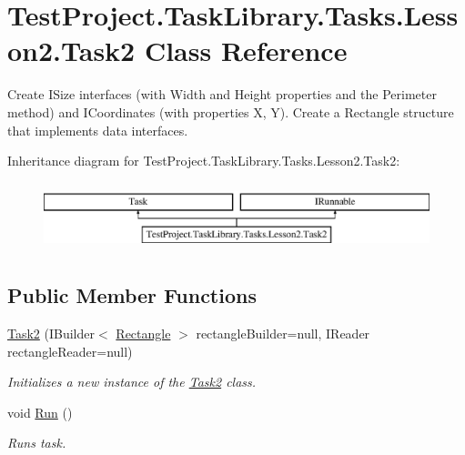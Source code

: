 \hypertarget{class_test_project_1_1_task_library_1_1_tasks_1_1_lesson2_1_1_task2}{}\section{Test\+Project.\+Task\+Library.\+Tasks.\+Lesson2.\+Task2 Class Reference}
\label{class_test_project_1_1_task_library_1_1_tasks_1_1_lesson2_1_1_task2}


Create I\+Size interfaces (with Width and Height properties and the Perimeter method) and I\+Coordinates (with properties X, Y). Create a Rectangle structure that implements data interfaces.  


Inheritance diagram for Test\+Project.\+Task\+Library.\+Tasks.\+Lesson2.\+Task2\+:\begin{figure}[H]
\begin{center}
\leavevmode
\includegraphics[height=2.000000cm]{class_test_project_1_1_task_library_1_1_tasks_1_1_lesson2_1_1_task2}
\end{center}
\end{figure}
\subsection*{Public Member Functions}
\begin{DoxyCompactItemize}
\item 
\mbox{\hyperlink{class_test_project_1_1_task_library_1_1_tasks_1_1_lesson2_1_1_task2_a0dc2439be966c494ca1b8097df9a803c}{Task2}} (I\+Builder$<$ \mbox{\hyperlink{struct_test_project_1_1_task_library_1_1_tasks_1_1_lesson2_1_1_models_1_1_rectangle}{Rectangle}} $>$ rectangle\+Builder=null, I\+Reader rectangle\+Reader=null)
\begin{DoxyCompactList}\small\item\em Initializes a new instance of the \mbox{\hyperlink{class_test_project_1_1_task_library_1_1_tasks_1_1_lesson2_1_1_task2}{Task2}} class. \end{DoxyCompactList}\item 
void \mbox{\hyperlink{class_test_project_1_1_task_library_1_1_tasks_1_1_lesson2_1_1_task2_ad1a73d4b561ec864dcfe1f646772fc2d}{Run}} ()
\begin{DoxyCompactList}\small\item\em Runs task. \end{DoxyCompactList}\end{DoxyCompactItemize}



